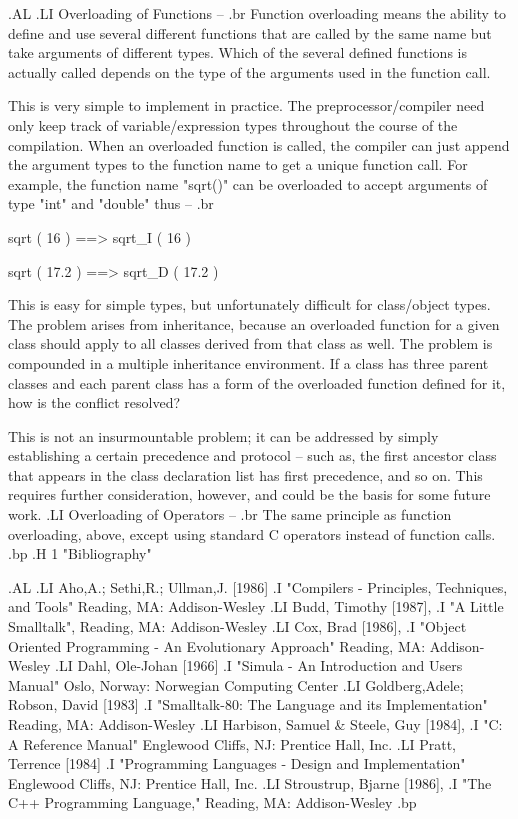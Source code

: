 .AL
.LI
Overloading of Functions --
.br
Function overloading means the ability to define and use several different
functions that are called by the same name but take arguments of different
types.  Which of the several defined functions is actually called depends on
the type of the arguments used in the function call.

This is very simple to implement in practice.  The preprocessor/compiler
need only keep track of variable/expression types throughout the course of
the compilation.  When an overloaded function is called, the compiler can
just append the argument types to the function name to get a unique function
call.  For example, the function name "sqrt()" can be overloaded to accept
arguments of type "int" and "double" thus --
.br

sqrt ( 16 )    ==>   sqrt_I ( 16 )

sqrt ( 17.2 )  ==>   sqrt_D ( 17.2 )

This is easy for simple types, but unfortunately difficult for class/object
types.  The problem arises from inheritance, because an overloaded function
for a given class should apply to all classes derived from that class as
well.  The problem is compounded in a multiple inheritance environment.
If a class has three parent classes and each parent class has a form of the
overloaded function defined for it, how is the conflict resolved?

This is not an insurmountable problem; it can be addressed by simply
establishing a certain precedence and protocol -- such as, the first
ancestor class that appears in the class declaration list has first
precedence, and so on.  This requires further consideration, however, and
could be the basis for some future work.
.LI
Overloading of Operators --
.br
The same principle as function overloading, above, except using
standard C operators instead of function calls.
.bp
.H 1 "Bibliography"

.AL
.LI
Aho,A.; Sethi,R.; Ullman,J. [1986]
.I "Compilers - Principles, Techniques, and Tools"
Reading, MA: Addison-Wesley
.LI
Budd, Timothy [1987],
.I "A Little Smalltalk",
Reading, MA: Addison-Wesley
.LI
Cox, Brad [1986],
.I "Object Oriented Programming - An Evolutionary Approach"
Reading, MA: Addison-Wesley
.LI
Dahl, Ole-Johan [1966]
.I "Simula - An Introduction and Users Manual"
Oslo, Norway:  Norwegian Computing Center
.LI
Goldberg,Adele; Robson, David [1983]
.I "Smalltalk-80: The Language and its Implementation"
Reading, MA: Addison-Wesley
.LI
Harbison, Samuel & Steele, Guy [1984],
.I "C: A Reference Manual"
Englewood Cliffs, NJ: Prentice Hall, Inc.
.LI
Pratt, Terrence [1984]
.I "Programming Languages - Design and Implementation"
Englewood Cliffs, NJ: Prentice Hall, Inc.
.LI
Stroustrup, Bjarne [1986],
.I "The C++ Programming Language,"
Reading, MA: Addison-Wesley
.bp
